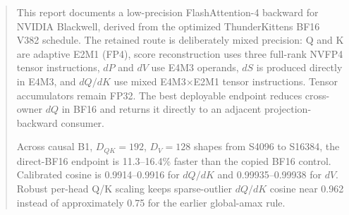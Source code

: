 \begin{abstract}
This report documents a low-precision FlashAttention-4 backward for NVIDIA
Blackwell, derived from the optimized ThunderKittens BF16 V382 schedule.  The
retained route is deliberately mixed precision: Q and K are adaptive E2M1
(FP4), score reconstruction uses three full-rank NVFP4 tensor instructions,
$dP$ and $dV$ use E4M3 operands, $dS$ is produced directly in E4M3, and
$dQ/dK$ use mixed E4M3$\times$E2M1 tensor instructions.  Tensor accumulators
remain FP32.  The best deployable endpoint reduces cross-owner $dQ$ in BF16
and returns it directly to an adjacent projection-backward consumer.

Across causal B1, $D_{QK}=192$, $D_V=128$ shapes from S4096 to S16384, the
direct-BF16 endpoint is 11.3--16.4\% faster than the copied BF16 control.
Calibrated cosine is 0.9914--0.9916 for $dQ/dK$ and 0.99935--0.99938 for
$dV$.  Robust per-head Q/K scaling keeps sparse-outlier $dQ/dK$ cosine near
0.962 instead of approximately 0.75 for the earlier global-amax rule.


\end{abstract}
